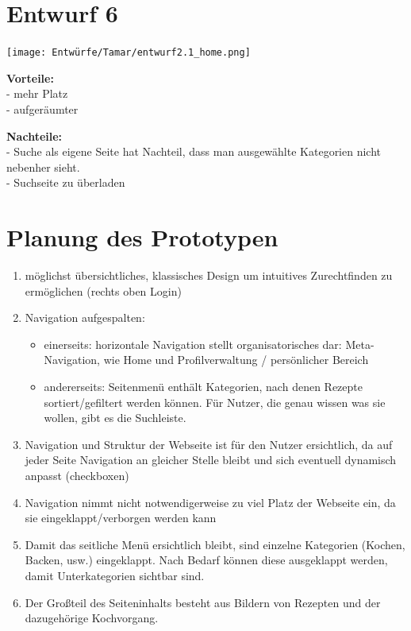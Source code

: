 \documentclass[parskip,10pt,abstracton]{scrartcl}
\begin{document}
\section*{Entwurf 6} %

\texttt{[image: Entwürfe/Tamar/entwurf2.1\_home.png]}


\textbf{Vorteile:} \\
- mehr Platz\\
- aufgeräumter

\textbf{Nachteile:}\\
- Suche als eigene Seite hat Nachteil, dass man ausgewählte Kategorien nicht nebenher sieht.\\
- Suchseite zu überladen


\pagebreak
\section*{Planung des Prototypen}

\begin{enumerate}
 \item möglichst übersichtliches, klassisches Design um intuitives Zurechtfinden zu ermöglichen (rechts oben Login)
 \item Navigation aufgespalten:
 \begin{itemize}
  \item einerseits: horizontale Navigation stellt organisatorisches dar: Meta-Navigation, wie Home und Profilverwaltung / persönlicher Bereich
  \item andererseits: Seitenmenü enthält Kategorien, nach denen Rezepte sortiert/gefiltert werden können. Für Nutzer, die genau wissen was sie wollen, gibt es die Suchleiste.
 \end{itemize}
 \item Navigation und Struktur der Webseite ist für den Nutzer ersichtlich, da auf jeder Seite Navigation an gleicher Stelle bleibt und sich eventuell dynamisch anpasst (checkboxen)
 \item Navigation nimmt nicht notwendigerweise zu viel Platz der Webseite ein, da sie eingeklappt/verborgen werden kann
 \item Damit das seitliche Menü ersichtlich bleibt, sind einzelne Kategorien (Kochen, Backen, usw.) eingeklappt. Nach Bedarf können diese ausgeklappt werden, damit Unterkategorien sichtbar sind. 
 \item Der Großteil des Seiteninhalts besteht aus Bildern von Rezepten und der dazugehörige Kochvorgang.

\end{enumerate}
\end{document}

